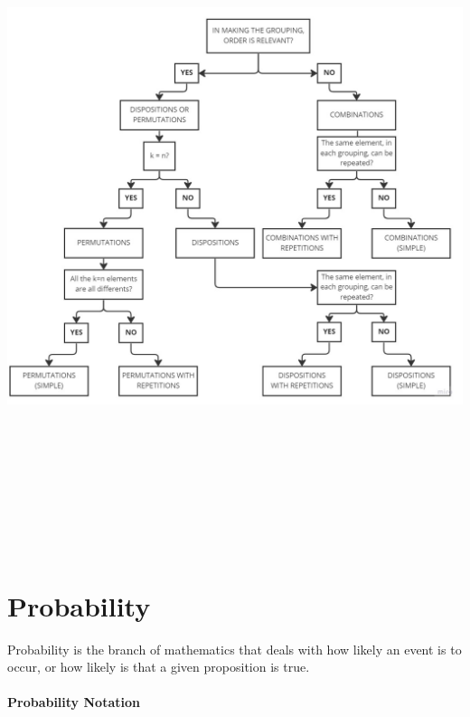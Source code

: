 \documentclass{article}
\begin{document}
\begin{adjustwidth}{-2.0cm}{-3.0cm}

    \includegraphics[width=20cm, height=20cm]{stat_diagram}

\end{adjustwidth}
\clearpage

\section{Probability}
Probability is the branch of mathematics that deals with how likely an event is to occur, or how likely is that a given proposition is true.

\paragraph{Probability Notation}\mbox{} \\
\end{document}
